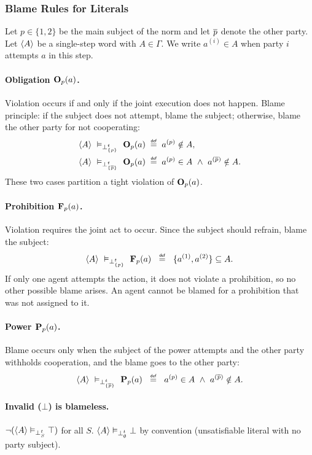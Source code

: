 \subsubsection*{Blame Rules for Literals}
\begin{definition}
Let $p\in\{1,2\}$ be the main subject of the norm and let $\barp$ denote the other party.
Let $\trace{A}$ be a single-step word with $A\in\Gamma$. We write $a^{(i)}\in A$ when party $i$ attempts $a$ in this step.

\paragraph{Obligation \(\obl[p]{a}\).}
Violation occurs if and only if the joint execution does not happen. Blame principle:
if the subject does not attempt, blame the subject; otherwise, blame the other party for not cooperating:
\[
\begin{aligned}
\trace{A}\ \vDash_{\bottp{\{p\}}}\ \obl[p]{a} \;&\mydef\; a^{(p)}\notin A,\\
\trace{A}\ \vDash_{\bottp{\{\barp\}}}\ \obl[p]{a} \;&\mydef\; a^{(p)}\in A\ \land\ a^{(\barp)}\notin A.
\end{aligned}
\]
These two cases partition a tight violation of $\obl[p]{a}$.

\paragraph{Prohibition \(\frb[p]{a}\).}
Violation requires the joint act to occur. Since the subject should refrain, blame the subject:
\[
\trace{A}\ \vDash_{\bottp{\{p\}}}\ \frb[p]{a}\ \;\mydef\;\ \{a^{(1)}, a^{(2)}\}\subseteq A.
\]
If only one agent attempts the action, it does not violate a prohibition, so no other possible blame arises. An agent cannot be blamed for a prohibition that was not assigned to it.

\paragraph{Power \(\perm[p]{a}\).}
Blame occurs only when the subject of the power attempts and the other party withholds cooperation, and the blame goes to the other party:
\[
\trace{A}\ \vDash_{\bottp{\{\barp\}}}\ \perm[p]{a}\ \;\mydef\;\ a^{(p)}\in A\ \land\ a^{(\barp)}\notin A.
\]

\paragraph{Invalid ($\bot$) is blameless.}
\(\lnot(\trace{A}\vDash_{\bottp{S}}\top)\) for all $S$. 
\(\trace{A}\vDash_{\bottp{\emptyset}}\bot\) by convention (unsatisfiable literal with no party subject).


\end{definition}
